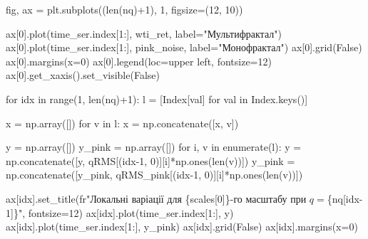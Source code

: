 \documentclass[
  letterpaper,
]{report}
\newenvironment{Shaded}{\begin{snugshade}}{\end{snugshade}}
\newcommand{\BuiltInTok}[1]{\textcolor[rgb]{0.00,0.23,0.31}{#1}}
\newcommand{\ControlFlowTok}[1]{\textcolor[rgb]{0.00,0.23,0.31}{#1}}
\newcommand{\DecValTok}[1]{\textcolor[rgb]{0.68,0.00,0.00}{#1}}
\newcommand{\KeywordTok}[1]{\textcolor[rgb]{0.00,0.23,0.31}{#1}}
\newcommand{\NormalTok}[1]{\textcolor[rgb]{0.00,0.23,0.31}{#1}}
\newcommand{\OperatorTok}[1]{\textcolor[rgb]{0.37,0.37,0.37}{#1}}
\newcommand{\SpecialCharTok}[1]{\textcolor[rgb]{0.37,0.37,0.37}{#1}}
\newcommand{\StringTok}[1]{\textcolor[rgb]{0.13,0.47,0.30}{#1}}
\newcommand{\VariableTok}[1]{\textcolor[rgb]{0.07,0.07,0.07}{#1}}
\newcommand{\VerbatimStringTok}[1]{\textcolor[rgb]{0.13,0.47,0.30}{#1}}
\begin{document}
\begin{Shaded}
\begin{Highlighting}[]
\NormalTok{fig, ax }\OperatorTok{=}\NormalTok{ plt.subplots((}\BuiltInTok{len}\NormalTok{(nq)}\OperatorTok{+}\DecValTok{1}\NormalTok{), }\DecValTok{1}\NormalTok{, figsize}\OperatorTok{=}\NormalTok{(}\DecValTok{12}\NormalTok{, }\DecValTok{10}\NormalTok{))}

\NormalTok{ax[}\DecValTok{0}\NormalTok{].plot(time\_ser.index[}\DecValTok{1}\NormalTok{:], wti\_ret, label}\OperatorTok{=}\StringTok{"Мультифрактал"}\NormalTok{)}
\NormalTok{ax[}\DecValTok{0}\NormalTok{].plot(time\_ser.index[}\DecValTok{1}\NormalTok{:], pink\_noise, label}\OperatorTok{=}\StringTok{"Монофрактал"}\NormalTok{)}
\NormalTok{ax[}\DecValTok{0}\NormalTok{].grid(}\VariableTok{False}\NormalTok{)}
\NormalTok{ax[}\DecValTok{0}\NormalTok{].margins(x}\OperatorTok{=}\DecValTok{0}\NormalTok{)}
\NormalTok{ax[}\DecValTok{0}\NormalTok{].legend(loc}\OperatorTok{=}\StringTok{\textquotesingle{}upper left\textquotesingle{}}\NormalTok{, fontsize}\OperatorTok{=}\DecValTok{12}\NormalTok{)}
\NormalTok{ax[}\DecValTok{0}\NormalTok{].get\_xaxis().set\_visible(}\VariableTok{False}\NormalTok{)}


\ControlFlowTok{for}\NormalTok{ idx }\KeywordTok{in} \BuiltInTok{range}\NormalTok{(}\DecValTok{1}\NormalTok{, }\BuiltInTok{len}\NormalTok{(nq)}\OperatorTok{+}\DecValTok{1}\NormalTok{):}
\NormalTok{    l }\OperatorTok{=}\NormalTok{ [Index[val] }\ControlFlowTok{for}\NormalTok{ val }\KeywordTok{in}\NormalTok{ Index.keys()]}

\NormalTok{    x }\OperatorTok{=}\NormalTok{ np.array([])}
    \ControlFlowTok{for}\NormalTok{ v }\KeywordTok{in}\NormalTok{ l:}
\NormalTok{        x }\OperatorTok{=}\NormalTok{ np.concatenate([x, v])}

\NormalTok{    y }\OperatorTok{=}\NormalTok{ np.array([])}
\NormalTok{    y\_pink }\OperatorTok{=}\NormalTok{ np.array([])}
    \ControlFlowTok{for}\NormalTok{ i, v }\KeywordTok{in} \BuiltInTok{enumerate}\NormalTok{(l): }
\NormalTok{        y }\OperatorTok{=}\NormalTok{ np.concatenate([y, qRMS[(idx}\OperatorTok{{-}}\DecValTok{1}\NormalTok{, }\DecValTok{0}\NormalTok{)][i]}\OperatorTok{*}\NormalTok{np.ones(}\BuiltInTok{len}\NormalTok{(v))])}
\NormalTok{        y\_pink }\OperatorTok{=}\NormalTok{ np.concatenate([y\_pink, qRMS\_pink[(idx}\OperatorTok{{-}}\DecValTok{1}\NormalTok{, }\DecValTok{0}\NormalTok{)][i]}\OperatorTok{*}\NormalTok{np.ones(}\BuiltInTok{len}\NormalTok{(v))])}
    
\NormalTok{    ax[idx].set\_title(}\VerbatimStringTok{fr"Локальні варіації для }\SpecialCharTok{\{}\NormalTok{scales[}\DecValTok{0}\NormalTok{]}\SpecialCharTok{\}}\VerbatimStringTok{{-}го масштабу при $q=$}\SpecialCharTok{\{}\NormalTok{nq[idx}\OperatorTok{{-}}\DecValTok{1}\NormalTok{]}\SpecialCharTok{\}}\VerbatimStringTok{"}\NormalTok{, fontsize}\OperatorTok{=}\DecValTok{12}\NormalTok{)}
\NormalTok{    ax[idx].plot(time\_ser.index[}\DecValTok{1}\NormalTok{:], y)}
\NormalTok{    ax[idx].plot(time\_ser.index[}\DecValTok{1}\NormalTok{:], y\_pink)}
\NormalTok{    ax[idx].grid(}\VariableTok{False}\NormalTok{)}
\NormalTok{    ax[idx].margins(x}\OperatorTok{=}\DecValTok{0}\NormalTok{)       }
    

\end{Highlighting}
\end{Shaded}
\end{document}

